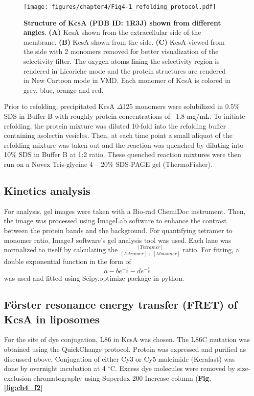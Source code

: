 \begin{figure}[!ht]
\begin{center}
	\texttt{[image: figures/chapter4/Fig4-1\_refolding\_protocol.pdf]}
\end{center}
	\caption{\textbf{Structure of KcsA (PDB ID: 1R3J) shown from different angles}. \textbf{(A)} KcsA shown from the extracellular side of the membrane. \textbf{(B)} KcsA shown from the side. \textbf{(C)} KcsA viewed from the side with 2 monomers removed for better visualization of the selectivity filter. The oxygen atoms lining the selectivity region is rendered in Licoriche mode and the protein structures are rendered in New Cartoon mode in VMD. Each monomer of KcsA is colored in grey, blue, orange and red.}
	\label{fig:ch4_f1}
\end{figure}

Prior to refolding, precipitated KcsA $\Delta$125 monomers were solubilized in 0.5\% SDS in Buffer B with roughly protein concentrations of ~1.8 mg/mL. To initiate refolding, the protein mixture was diluted 10-fold into the refolding buffer containing asolectin vesicles. Then, at each time point a small aliquot of the refolding mixture was taken out and the reaction was quenched by diluting into 10\% SDS in Buffer B at 1:2 ratio. These quenched reaction mixtures were then run on a Novex Tris-glycine 4 – 20\% SDS-PAGE gel (ThermoFisher).

\subsection{Kinetics analysis}
	For analysis, gel images were taken with a Bio-rad ChemiDoc instrument. Then, the image was processed using ImageLab software to enhance the contrast between the protein bands and the background. For quantifying tetramer to monomer ratio, ImageJ software’s gel analysis tool was used. Each lane was normalized to itself by calculating the $\frac{[Tetramer]}{[Tetramer]+[Monomer]}$ ratio. For fitting, a double exponential function in the form of
	\begin{equation} a-be^{-\frac{t}{c}}-de^{-\frac{t}{e}} \end{equation}
was used and fitted using Scipy.optimize package in python.

\subsection{F\"{o}rster resonance energy transfer (FRET) of KcsA in liposomes}
For the site of dye conjugation, L86 in KcsA was chosen. The L86C mutation was obtained using the QuickChange protocol. Protein was expressed and purified as discussed above. Conjugation of either Cy3 or Cy5 maleimide (Kerafast) was done by overnight incubation at 4 $^{\circ}$C. Excess dye molecules were removed by size-exclusion chromatography using Superdex 200 Increase column (\textbf{Fig. \ref{fig:ch4_f2}} 


